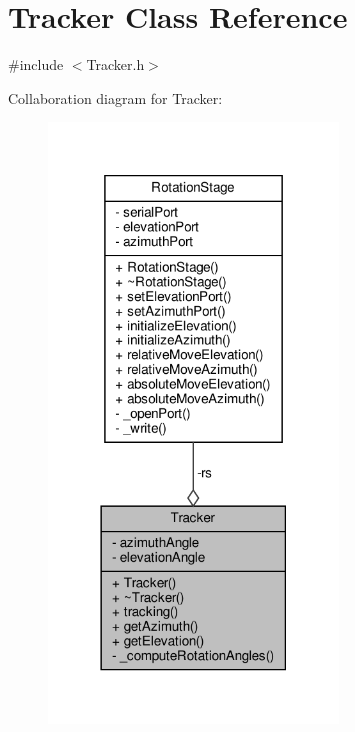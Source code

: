 \hypertarget{class_tracker}{}\section{Tracker Class Reference}
\label{class_tracker}


{\ttfamily \#include $<$Tracker.\+h$>$}



Collaboration diagram for Tracker\+:
\nopagebreak
\begin{figure}[H]
\begin{center}
\leavevmode
\includegraphics[width=218pt]{class_tracker__coll__graph}
\end{center}
\end{figure}

